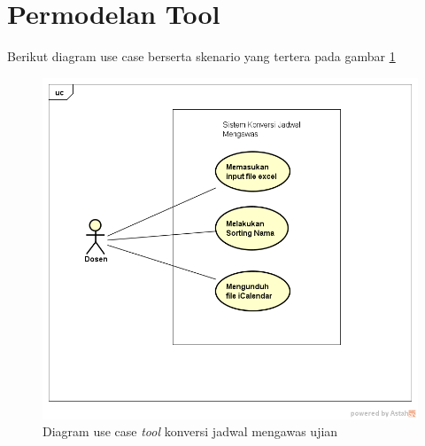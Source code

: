 \section{Permodelan Tool}

Berikut diagram use case berserta skenario yang tertera pada gambar \ref{fig:useCase}

\begin{figure}[h]
	\centering
	\includegraphics[scale=0.5]{Gambar/useCaseJadwal}
	\caption{Diagram use case \textit{tool} konversi jadwal mengawas ujian}
	\label{fig:useCase}
	\end{figure}

